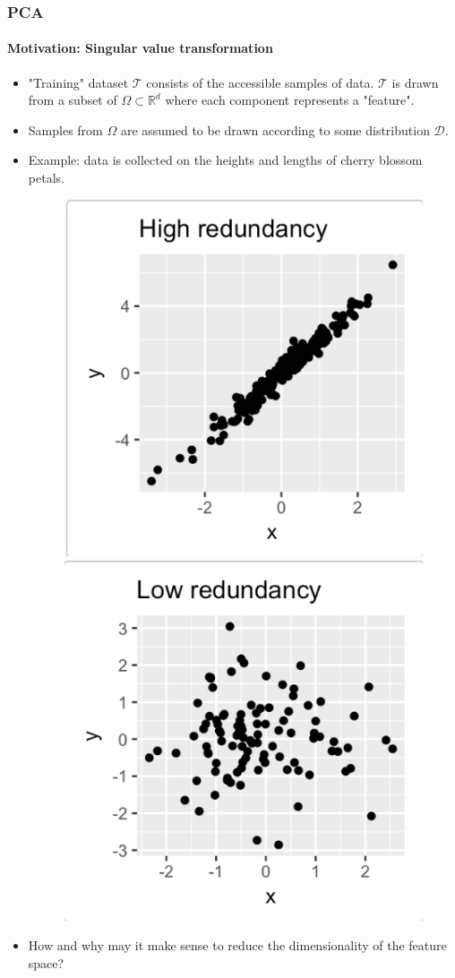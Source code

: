 \documentclass{beamer}
\newcommand\0{\mathbf{0}}
\newcommand\RR{\mathbb{R}}
\newcommand\<{\langle}
\renewcommand\>{\rangle}
\begin{document}
  \begin{frame}
  	\frametitle{PCA}
    \framesubtitle{Motivation: Singular value transformation}
    \begin{itemize}
    \item "Training" dataset $\mathcal{T}$ consists of the accessible samples of data. $\mathcal{T}$ is drawn from a subset of $\Omega \subset \RR^d$ where each component represents a "feature". 
    \item Samples from $\Omega$ are assumed to be drawn according to some distribution $\mathcal{D}$. 
    \item Example: data is collected on the heights and lengths of cherry blossom petals. 
    \begin{figure}
   \includegraphics[width= 0.3\linewidth]{pca_high_redundancy.png}
   \includegraphics[width= 0.3\linewidth]{pca_low_redundancy}	
\end{figure}
\item How and why may it make sense to reduce the dimensionality of the feature space?
\end{itemize}
\end{frame}
\end{document}
